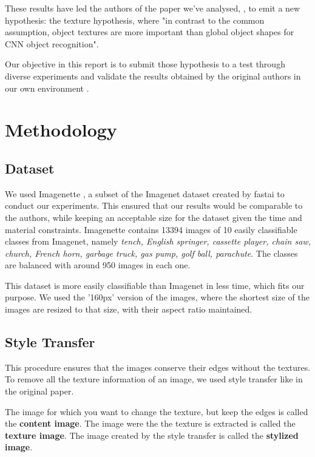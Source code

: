 \documentclass{article}
\begin{document}
\noindent
These results have led the authors of the paper we've analysed, \cite{geirhos2018imagenettrained}, 
to emit a new hypothesis: the texture hypothesis, where "in contrast to the
common assumption, object textures are more important than global object shapes for CNN object
recognition". \medskip \par

Our objective in this report is to submit those hypothesis to a test through diverse experiments 
and validate the results obtained by the original authors in our own environment .

\newpage
\section{Methodology}

\subsection{Dataset}

We used Imagenette \cite{fastai2019}, a subset of the Imagenet dataset created 
by fastai to conduct our experiments.
This ensured that our results would be comparable to the authors, 
while keeping an acceptable size for the dataset given the time and material constraints.
Imagenette contains 13394 images of 10 easily classifiable classes from Imagenet, namely
\textit{tench, English springer, cassette player, chain saw, church, 
French horn, garbage truck, gas pump, golf ball, parachute}.
The classes are balanced with around 950 images in each one. \medskip \par
\noindent
This dataset is more easily classifiable than Imagenet in less time, which fits our purpose.
We used the '160px' version of the images, where the shortest size of the images are resized to that size, 
with their aspect ratio maintained.

\subsection{Style Transfer}
\label{2.2-style-transfer}

This procedure ensures that the images conserve their edges without the textures.
To remove all the texture information of an image, we used style transfer like in
the original paper. \medskip \par

\noindent
The image for which you want to change the texture, but keep the edges is called the \textbf{content image}.
The image were the the texture is extracted is called the \textbf{texture image}.
The image created by the style transfer is called the \textbf{stylized image}. \medskip \par
\end{document}
